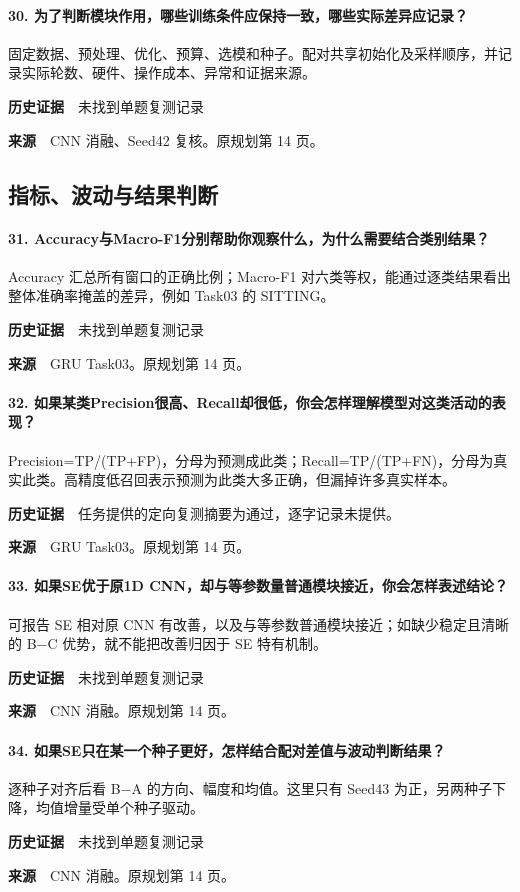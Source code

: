 \paragraph{30. 为了判断模块作用，哪些训练条件应保持一致，哪些实际差异应记录？}
固定数据、预处理、优化、预算、选模和种子。配对共享初始化及采样顺序，并记录实际轮数、硬件、操作成本、异常和证据来源。\par
\textbf{历史证据}　未找到单题复测记录\par
\textbf{来源}　CNN 消融、Seed42 复核。原规划第 14 页。\par
\clearpage\subsection{指标、波动与结果判断}
\paragraph{31. Accuracy与Macro-F1分别帮助你观察什么，为什么需要结合类别结果？}
Accuracy 汇总所有窗口的正确比例；Macro-F1 对六类等权，能通过逐类结果看出整体准确率掩盖的差异，例如 Task03 的 SITTING。\par
\textbf{历史证据}　未找到单题复测记录\par
\textbf{来源}　GRU Task03。原规划第 14 页。\par
\paragraph{32. 如果某类Precision很高、Recall却很低，你会怎样理解模型对这类活动的表现？}
Precision=TP/(TP+FP)，分母为预测成此类；Recall=TP/(TP+FN)，分母为真实此类。高精度低召回表示预测为此类大多正确，但漏掉许多真实样本。\par
\textbf{历史证据}　任务提供的定向复测摘要为通过，逐字记录未提供。\par
\textbf{来源}　GRU Task03。原规划第 14 页。\par
\paragraph{33. 如果SE优于原1D CNN，却与等参数量普通模块接近，你会怎样表述结论？}
可报告 SE 相对原 CNN 有改善，以及与等参数普通模块接近；如缺少稳定且清晰的 B\(\mathord{-}\)C 优势，就不能把改善归因于 SE 特有机制。\par
\textbf{历史证据}　未找到单题复测记录\par
\textbf{来源}　CNN 消融。原规划第 14 页。\par
\paragraph{34. 如果SE只在某一个种子更好，怎样结合配对差值与波动判断结果？}
逐种子对齐后看 B\(\mathord{-}\)A 的方向、幅度和均值。这里只有 Seed43 为正，另两种子下降，均值增量受单个种子驱动。\par
\textbf{历史证据}　未找到单题复测记录\par
\textbf{来源}　CNN 消融。原规划第 14 页。\par
